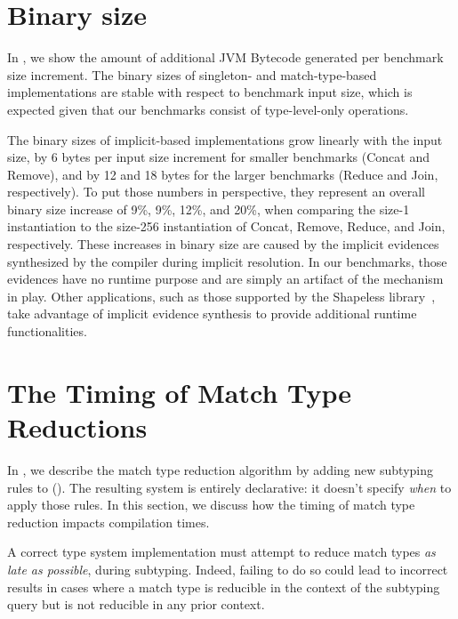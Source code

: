 \section{Binary size}
\label{sec:binary-size}


In , we show the amount of additional JVM Bytecode generated per benchmark size increment.
The binary sizes of singleton- and match-type-based implementations are stable with respect to benchmark input size, which is expected given that our benchmarks consist of type-level-only operations.

The binary sizes of implicit-based implementations grow linearly with the input size, by 6 bytes per input size increment for smaller benchmarks (Concat and Remove), and by 12 and 18 bytes for the larger benchmarks (Reduce and Join, respectively).
To put those numbers in perspective, they represent an overall binary size increase of 9\%, 9\%, 12\%, and 20\%, when comparing the size-1 instantiation to the size-256 instantiation of Concat, Remove, Reduce, and Join, respectively.
These increases in binary size are caused by the implicit evidences synthesized by the compiler during implicit resolution.
In our benchmarks, those evidences have no runtime purpose and are simply an artifact of the mechanism in play.
Other applications, such as those supported by the Shapeless library~\citep{sabin2011shapeless}, take advantage of implicit evidence synthesis to provide additional runtime functionalities.

\section{The Timing of Match Type Reductions}
\label{sec:the-timing-of-match-type-reductions}

In , we describe the match type reduction algorithm by adding new subtyping rules to \SystemFsub ().
The resulting system is entirely declarative: it doesn't specify \emph{when} to apply those rules.
In this section, we discuss how the timing of match type reduction impacts compilation times.

A correct type system implementation must attempt to reduce match types \emph{as late as possible}, during subtyping.
Indeed, failing to do so could lead to incorrect results in cases where a match type is reducible in the context of the subtyping query but is not reducible in any prior context.

